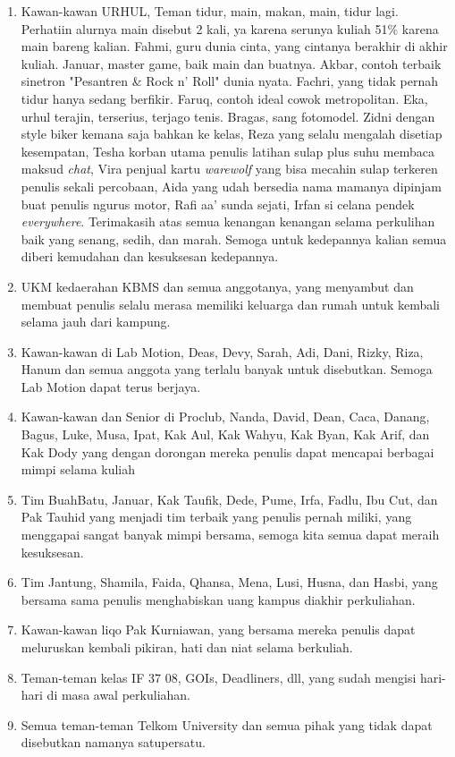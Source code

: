 \begin{enumerate}
      \item Kawan-kawan URHUL, Teman tidur, main, makan, main, tidur lagi. Perhatiin alurnya main disebut 2 kali, ya karena serunya kuliah 51\% karena main bareng kalian. Fahmi, guru dunia cinta, yang cintanya berakhir di akhir kuliah. Januar, master game, baik main dan buatnya. Akbar, contoh terbaik sinetron "Pesantren \& Rock n' Roll" dunia nyata. Fachri, yang tidak pernah tidur hanya sedang berfikir. Faruq, contoh ideal cowok metropolitan. Eka, urhul terajin, terserius, terjago tenis. Bragas, sang fotomodel. Zidni dengan style biker kemana saja bahkan ke kelas, Reza yang selalu mengalah disetiap kesempatan, Tesha korban utama penulis latihan sulap plus suhu membaca maksud \textit{chat}, Vira penjual kartu \textit{warewolf} yang bisa mecahin sulap terkeren penulis sekali percobaan, Aida yang udah bersedia nama mamanya dipinjam buat penulis ngurus motor, Rafi aa' sunda sejati, Irfan si celana pendek \textit{everywhere}. Terimakasih atas semua kenangan kenangan selama perkulihan baik yang senang, sedih, dan marah. Semoga untuk kedepannya kalian semua diberi kemudahan dan kesuksesan kedepannya.
      \item UKM kedaerahan KBMS dan semua anggotanya, yang menyambut dan membuat penulis selalu merasa memiliki keluarga dan rumah untuk kembali selama jauh dari kampung.
      \item Kawan-kawan di Lab Motion, Deas, Devy, Sarah, Adi, Dani, Rizky, Riza, Hanum dan semua anggota yang terlalu banyak untuk disebutkan. Semoga Lab Motion dapat terus berjaya.
      \item Kawan-kawan dan Senior di Proclub, Nanda, David, Dean, Caca, Danang, Bagus, Luke, Musa, Ipat, Kak Aul, Kak Wahyu, Kak Byan, Kak Arif, dan Kak Dody yang dengan dorongan mereka penulis dapat mencapai berbagai mimpi selama kuliah
      \item Tim BuahBatu, Januar, Kak Taufik, Dede, Pume, Irfa, Fadlu, Ibu Cut, dan Pak Tauhid yang menjadi tim terbaik yang penulis pernah miliki, yang menggapai sangat banyak mimpi bersama, semoga kita semua dapat meraih kesuksesan.
      \item Tim Jantung, Shamila, Faida, Qhansa, Mena, Lusi, Husna, dan Hasbi, yang bersama sama penulis menghabiskan uang kampus diakhir perkuliahan.
      \item Kawan-kawan liqo Pak Kurniawan, yang bersama mereka penulis dapat meluruskan kembali pikiran, hati dan niat selama berkuliah.
      \item Teman-teman kelas IF 37 08, GOIs, Deadliners, dll, yang sudah mengisi hari-hari di masa awal perkuliahan.
      \item Semua teman-teman Telkom University dan semua pihak yang tidak dapat disebutkan namanya satupersatu.
  \end{enumerate}